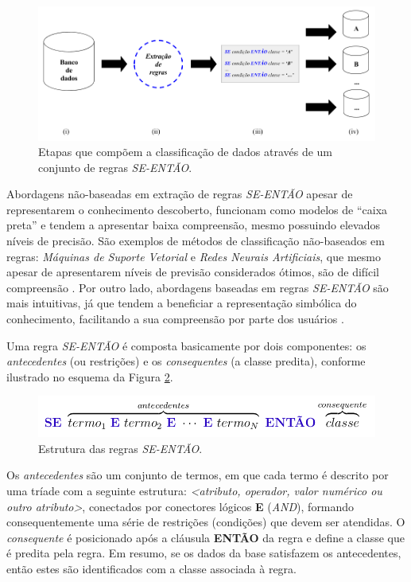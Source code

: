 \documentclass[
	12pt,				%
	openany,			%
	oneside,	
	a4paper,			%
	brazil,				%
	]{unimontes-ppgmsc-abntex2}
\begin{document}
\begin{figure}[ht]
\centering
\includegraphics[scale=.4]{img/modelo}
\caption{Etapas que compõem a classificação de dados através de um conjunto de regras {\em SE-ENTÃO}.}
\label{fig:modeloPSO}
\end{figure}

Abordagens não-baseadas em extração de regras {\em SE-ENTÃO} apesar de representarem o conhecimento descoberto, funcionam como modelos de ``caixa preta'' e tendem a apresentar baixa compreensão, mesmo possuindo elevados níveis de precisão. São exemplos de métodos de classificação não-baseados em regras: {\em Máquinas de Suporte Vetorial} e {\em Redes Neurais Artificiais}, que mesmo apesar de apresentarem níveis de previsão considerados ótimos, são de  difícil compreensão \cite{Hassani_2013}. Por outro lado, abordagens baseadas em regras {\em SE-ENTÃO} são mais intuitivas, já que tendem a beneficiar a representação simbólica do conhecimento, facilitando a sua compreensão por parte dos usuários \cite{Wang_2007}.

Uma regra {\em SE-ENTÃO} é composta basicamente por dois componentes: os {\em antecedentes} (ou restrições) e os {\em consequentes} (a classe predita), conforme ilustrado no esquema da Figura \ref{fig:se-entao}.

\begin{figure}[ht]
\centering
\includegraphics[scale=.5]{img/se-entao}
\caption{Estrutura das regras {\em SE-ENTÃO}.}
\label{fig:se-entao}
\end{figure}

Os {\em antecedentes} são um conjunto de termos, em que cada termo é descrito por uma tríade com a seguinte estrutura: \textit{<atributo, operador, valor numérico ou outro atributo>}, conectados por conectores lógicos \textbf{E} ({\em AND}), formando consequentemente uma série de restrições (condições) que devem ser atendidas. O {\em consequente} é posicionado após a cláusula \textbf{ENTÃO} da regra e define a classe que é predita pela regra. Em resumo, se os dados da base satisfazem os antecedentes, então estes são identificados com a classe associada à regra.
\end{document}
